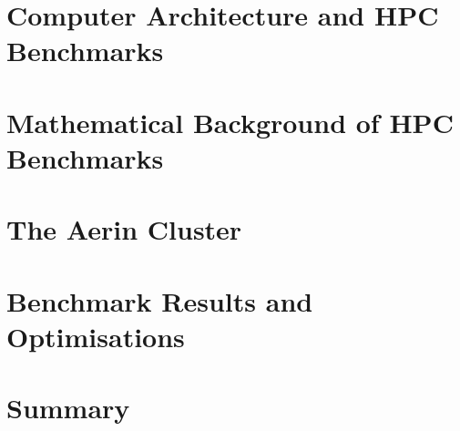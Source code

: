 \documentclass{report}
\begin{document}
%
%
\chapter{Computer Architecture and HPC Benchmarks}



%
%
\chapter{Mathematical Background of HPC Benchmarks}



%
%
\chapter{The Aerin Cluster}



%
%
\chapter{Benchmark Results and Optimisations}



%
%
\chapter{Summary}



%
%
\printbibliography[heading=bibintoc, title={References}]
\end{document}
